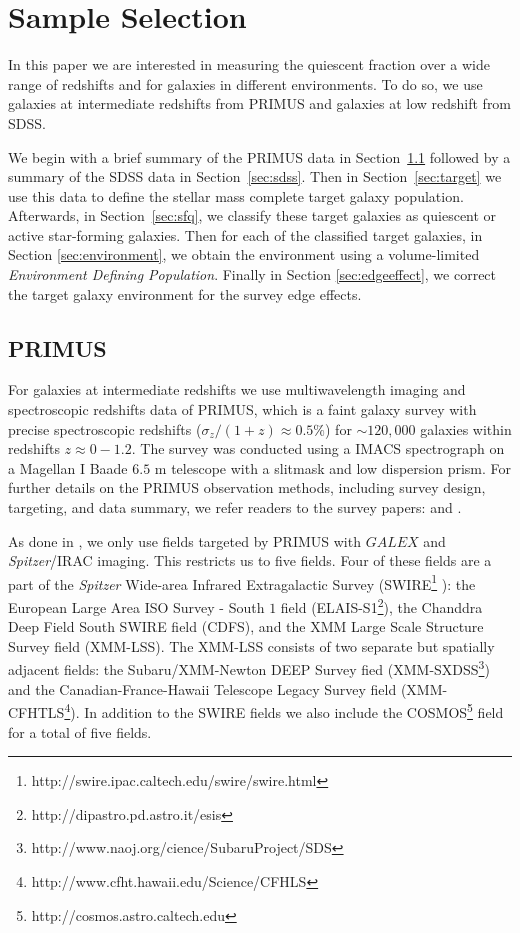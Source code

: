\documentclass{emulateapj}
\begin{document}
\section{Sample Selection}
In this paper we are interested in measuring the quiescent fraction over a wide range of redshifts and for galaxies in different environments. 
To do so, we use galaxies at intermediate redshifts from PRIMUS and galaxies at low redshift from SDSS.

We begin with a brief summary of the PRIMUS data in Section~\ref{sec:primus} followed by a summary of the SDSS data in Section~\ref{sec:sdss}.
Then in Section~\ref{sec:target} we use this data to define the stellar mass complete target galaxy population.
Afterwards, in Section~\ref{sec:sfq}, we classify these target galaxies as quiescent or active star-forming galaxies. 
Then for each of the classified target galaxies, in Section \ref{sec:environment}, we obtain the environment using a volume-limited {\em Environment Defining Population}.
Finally in Section \ref{sec:edgeeffect}, we correct the target galaxy environment for the survey edge effects. 

\subsection{PRIMUS} \label{sec:primus}
For galaxies at intermediate redshifts we use multiwavelength imaging and spectroscopic redshifts data of PRIMUS, which is a faint galaxy survey with precise spectroscopic redshifts ($\sigma_z/(1+z) \approx 0.5 \%$) for $\sim 120,000$ galaxies within redshifts $z \approx 0-1.2$.
The survey was conducted using a IMACS spectrograph on a Magellan I Baade $6.5$ m telescope with a slitmask and low dispersion prism.
For further details on the PRIMUS observation methods, including survey design, targeting, and data summary, we refer readers to the survey papers: \cite{Coil:2011aa} and \cite{Cool:2013aa}.

As done in \cite{Moustakas:2013aa}, we only use fields targeted by PRIMUS with $GALEX$ and {\em Spitzer}/IRAC imaging.
This restricts us to five fields.
Four of these fields are a part of the {\em Spitzer} Wide-area Infrared Extragalactic Survey (SWIRE\footnote{http://swire.ipac.caltech.edu/swire/swire.html} ): 
the European Large Area ISO Survey - South $1$ field (ELAIS-S1\footnote{http://dipastro.pd.astro.it/esis}), the Chanddra Deep Field South SWIRE field (CDFS), 
and the XMM Large Scale Structure Survey field (XMM-LSS).
The XMM-LSS consists of two separate but spatially adjacent fields: the Subaru/XMM-Newton DEEP Survey fied (XMM-SXDSS\footnote{http://www.naoj.org/cience/SubaruProject/SDS})
and the Canadian-France-Hawaii Telescope Legacy Survey field (XMM-CFHTLS\footnote{http://www.cfht.hawaii.edu/Science/CFHLS}).
In addition to the SWIRE fields we also include the COSMOS\footnote{http://cosmos.astro.caltech.edu} field for a total of five fields. 
\end{document}
